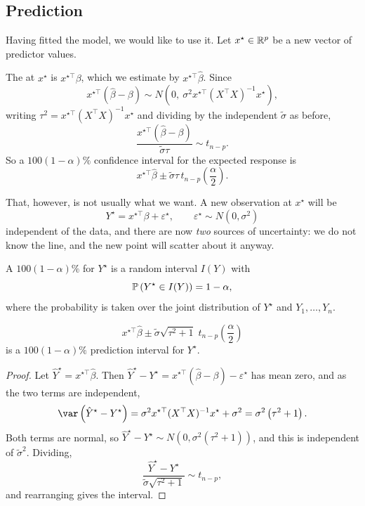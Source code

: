 \documentclass[a4paper]{scrartcl}
\begin{document}
\subsection{Prediction}

Having fitted the model, we would like to use it. Let $x^\star \in \mathbb{R}^p$ be a new vector of predictor values.

The  at $x^\star$ is $x^{\star\top}\beta$, which we estimate by $x^{\star\top}\hat\beta$. Since
$$
x^{\star\top}\left(\hat\beta-\beta\right)\sim N\left(0,\ \sigma^2 x^{\star\top}(X^\top X)^{-1}x^\star\right),
$$
writing $\tau^2 = x^{\star\top}(X^\top X)^{-1}x^\star$ and dividing by the independent $\tilde\sigma$ as before,
$$
\frac{x^{\star\top}(\hat\beta-\beta)}{\tilde\sigma\tau}\sim t_{n-p}.
$$
So a $100(1-\alpha)\%$ confidence interval for the expected response is
$$
x^{\star\top}\hat\beta \pm \tilde\sigma\tau\, t_{n-p}\!\left(\frac\alpha2\right).
$$

That, however, is not usually what we want. A new observation at $x^\star$ will be
$$
Y^\star = x^{\star\top}\beta + \varepsilon^\star, \qquad \varepsilon^\star\sim N(0,\sigma^2)
$$
independent of the data, and there are now \emph{two} sources of uncertainty: we do not know the line, and the new point will scatter about it anyway.

\begin{definition}
  A $100(1-\alpha)\%$  for $Y^\star$ is a random interval $I(Y)$ with
  $$
  \mathbb{P}\left(Y^\star \in I(Y)\right) = 1-\alpha,
  $$
  where the probability is taken over the joint distribution of $Y^\star$ and $Y_1,\dots,Y_n$.
\end{definition}

\begin{proposition}
  $$
  x^{\star\top}\hat\beta \pm \tilde\sigma\sqrt{\tau^2+1}\;t_{n-p}\!\left(\frac\alpha2\right)
  $$
  is a $100(1-\alpha)\%$ prediction interval for $Y^\star$.
\end{proposition}
\begin{proof}
  Let $\hat Y^\star = x^{\star\top}\hat\beta$. Then $\hat Y^\star - Y^\star = x^{\star\top}(\hat\beta-\beta)-\varepsilon^\star$ has mean zero, and as the two terms are independent,
  $$
  \var\left(\hat Y^\star - Y^\star\right) = \sigma^2 x^{\star\top}(X^\top X)^{-1}x^\star + \sigma^2 = \sigma^2\left(\tau^2+1\right).
  $$
  Both terms are normal, so $\hat Y^\star - Y^\star \sim N\left(0,\sigma^2(\tau^2+1)\right)$, and this is independent of $\tilde\sigma^2$. Dividing,
  $$
  \frac{\hat Y^\star - Y^\star}{\tilde\sigma\sqrt{\tau^2+1}}\sim t_{n-p},
  $$
  and rearranging gives the interval.
\end{proof}
\end{document}
